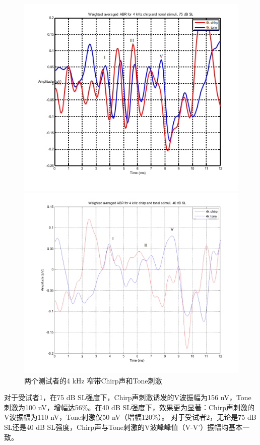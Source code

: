 \begin{figure}[H]
    \vspace{0.2cm}
    
    \begin{minipage}{0.48\textwidth}
        \includegraphics[width=\textwidth]{images/4kchirpAndTonalStimuli75db2.png}
    \end{minipage}
    \hfill
    \begin{minipage}{0.48\textwidth}
        \includegraphics[width=\textwidth]{images/4kchirpAndTonalStimuli40db2.png}
    \end{minipage}
    \caption{两个测试者的4 kHz 窄带Chirp声和Tone刺激}
    \label{fig:twotester4kchirpandtone}
\end{figure}
对于受试者1，在75 dB SL强度下，Chirp声刺激诱发的V波振幅为156 nV，Tone刺激为100 nV，增幅达56\%。在40 dB SL强度下，效果更为显著：Chirp声刺激的V波振幅为110 nV，Tone刺激仅50 nV（增幅120\%）。
对于受试者2，无论是75 dB SL还是40 dB SL强度，Chirp声与Tone刺激的V波峰峰值（V-V’）振幅均基本一致。

